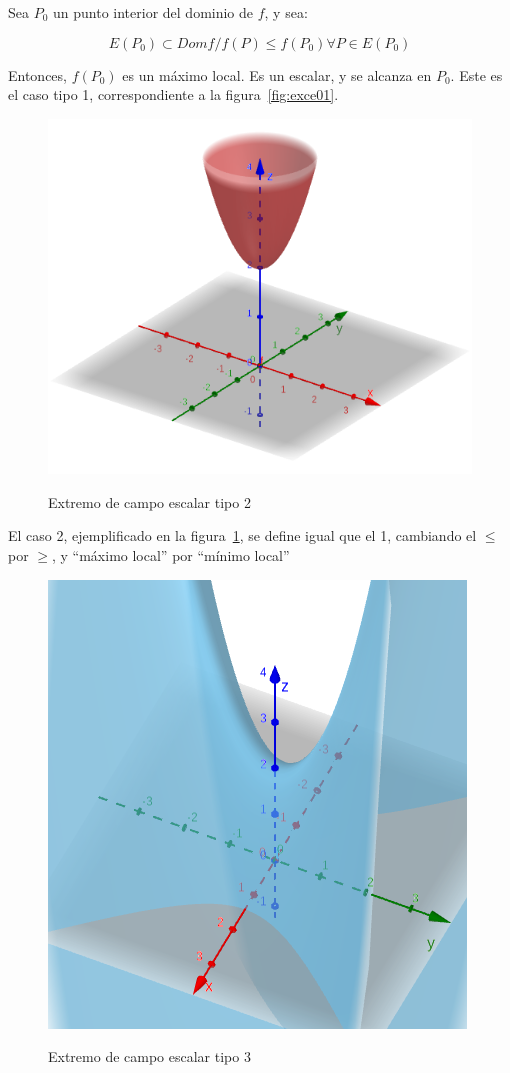 \documentclass{article}
\begin{document}
Sea $P_0$ un punto interior del dominio de $f$, y sea:

\begin{equation}
E(P_0) \subset Dom f / f(P) \leq f(P_0) \forall P \in E(P_0)
\end{equation}

Entonces, $f(P_0)$ es un máximo local. Es un escalar, y se alcanza en $P_0$. Este es el caso tipo 1, correspondiente a la figura~\ref{fig:exce01}. 

\begin{figure}[ht]
\caption{Extremo de campo escalar tipo 2}
\includegraphics[scale=0.6]{img/extremos/tipo2.png} 
\centering
\label{fig:exce02}
\end{figure}

El caso 2, ejemplificado en la figura~\ref{fig:exce02}, se define igual que el 1, cambiando el $\leq$ por $\geq$, y ``máximo local'' por ``mínimo local''

\begin{figure}[ht]
\caption{Extremo de campo escalar tipo 3}
\includegraphics[scale=0.6]{img/extremos/tipo3.png} 
\centering
\label{fig:exce03}
\end{figure}
\end{document}
